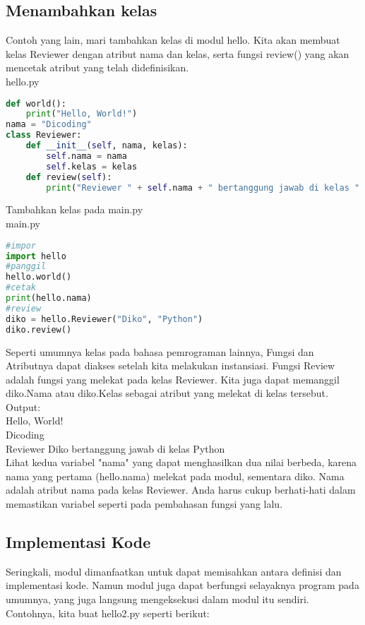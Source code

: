 \subsection{Menambahkan kelas}

Contoh yang lain, mari tambahkan kelas di modul hello. Kita akan membuat kelas Reviewer dengan atribut nama dan kelas, serta fungsi review() yang akan mencetak atribut yang telah didefinisikan.\\

hello.py

\begin{lstlisting}[language=Python]
def world():
    print("Hello, World!")
nama = "Dicoding"
class Reviewer:
    def __init__(self, nama, kelas):
        self.nama = nama
        self.kelas = kelas
    def review(self):
        print("Reviewer " + self.nama + " bertanggung jawab di kelas " + self.kelas)
\end{lstlisting}

Tambahkan kelas pada main.py\\

main.py
\begin{lstlisting}[language=Python]
#impor
import hello
#panggil
hello.world()
#cetak
print(hello.nama)
#review
diko = hello.Reviewer("Diko", "Python")
diko.review()
\end{lstlisting}

Seperti umumnya kelas pada bahasa pemrograman lainnya, Fungsi dan Atributnya dapat diakses setelah kita melakukan instansiasi. Fungsi Review adalah fungsi yang melekat pada kelas Reviewer. Kita juga dapat memanggil diko.Nama atau diko.Kelas sebagai atribut yang melekat di kelas tersebut.\\

Output:\\

Hello, World!\\
Dicoding\\
Reviewer Diko bertanggung jawab di kelas Python\\

Lihat kedua variabel "nama" yang dapat menghasilkan dua nilai berbeda, karena nama yang pertama (hello.nama) melekat pada modul, sementara diko. Nama adalah atribut nama pada kelas Reviewer. Anda harus cukup berhati-hati dalam memastikan variabel seperti pada pembahasan fungsi yang lalu.\\

\subsection{Implementasi Kode}
Seringkali, modul dimanfaatkan untuk dapat memisahkan antara definisi dan implementasi kode. Namun modul juga dapat berfungsi selayaknya program pada umumnya, yang juga langsung mengeksekusi dalam modul itu sendiri. Contohnya, kita buat hello2.py seperti berikut:\\

